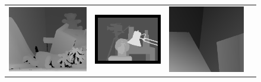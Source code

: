 \documentclass{article}
\begin{document}
\begin{figure}[h]
\begin{center}
\begin{tabular}{cccc}
\includegraphics[scale=0.23]{Images/teddy_disp.png} &
\includegraphics[scale=0.298]{Images/tsukuba_disp.png} &
\includegraphics[scale=0.225]{Images/venus_disp.png}\\

\end{tabular}
\end{center}
\end{figure}
\end{document}
